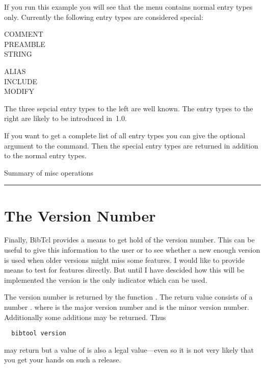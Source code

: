 If you run this example you will see that the menu contains normal
entry types only. Currently the following entry types are considered
special:\medskip

\mbox{}\hfill
\begin{minipage}{.3\textwidth}
  COMMENT	\\
  PREAMBLE	\\
  STRING
\end{minipage}\hfill
\begin{minipage}{.3\textwidth}
  ALIAS		\\
  INCLUDE	\\
  MODIFY
\end{minipage}
\hfill\mbox{}\medskip

The three sepcial entry types to the left are well known. The entry
types to the right are likely to be introduced in \BibTeX\,1.0.

If you want to get a complete list of all entry types you can give the
optional argument  to the 
command. Then the special entry types are returned in addition to the
normal entry types.



\begin{table}[tp]

  \caption{Summary of misc operations}\label{fig:tcl-misc}
  \rule{\textwidth}{.1pt}
\end{table}


\section{The Version Number}

Finally, BibTcl provides a means to get hold of the version number.
This can be useful to give this information to the user or to see
whether a new enough version is used when older versions might miss
some features. I would like to provide means to test for features
directly. But until I have descided how this will be implemented the
version is the only indicator which can be used.

The version number is returned by the function .
The return value consists of a number . where
 is the major version number and  is the minor
version number. Additionally some additions may be returned. Thus
\begin{verbatim}
  bibtool version
\end{verbatim}
\noindent may return  but a value of  is also
a legal value---even so it is not very likely that you get your hands
on such a release.


